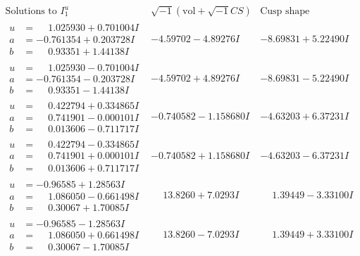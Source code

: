 \documentclass[1p]{elsarticle_modified}
\theoremstyle{definition}
\newcommand{\I}{\sqrt{-1}}
\begin{document}
$$\begin{array}{c|c|c}  
\text{Solutions to }I^u_{1}& \I (\text{vol} + \sqrt{-1}CS) & \text{Cusp shape}\\
 \hline 
\begin{aligned}
u &= \phantom{-}1.025930 + 0.701004 I \\
a &= -0.761354 + 0.203728 I \\
b &= \phantom{-}0.93351 + 1.44138 I\end{aligned}
 & -4.59702 - 4.89276 I & -8.69831 + 5.22490 I \\ \hline\begin{aligned}
u &= \phantom{-}1.025930 - 0.701004 I \\
a &= -0.761354 - 0.203728 I \\
b &= \phantom{-}0.93351 - 1.44138 I\end{aligned}
 & -4.59702 + 4.89276 I & -8.69831 - 5.22490 I \\ \hline\begin{aligned}
u &= \phantom{-}0.422794 + 0.334865 I \\
a &= \phantom{-}0.741901 - 0.000101 I \\
b &= \phantom{-}0.013606 - 0.711717 I\end{aligned}
 & -0.740582 - 1.158680 I & -4.63203 + 6.37231 I \\ \hline\begin{aligned}
u &= \phantom{-}0.422794 - 0.334865 I \\
a &= \phantom{-}0.741901 + 0.000101 I \\
b &= \phantom{-}0.013606 + 0.711717 I\end{aligned}
 & -0.740582 + 1.158680 I & -4.63203 - 6.37231 I \\ \hline\begin{aligned}
u &= -0.96585 + 1.28563 I \\
a &= \phantom{-}1.086050 - 0.661498 I \\
b &= \phantom{-}0.30067 + 1.70085 I\end{aligned}
 & \phantom{-}13.8260 + 7.0293 I & \phantom{-}1.39449 - 3.33100 I \\ \hline\begin{aligned}
u &= -0.96585 - 1.28563 I \\
a &= \phantom{-}1.086050 + 0.661498 I \\
b &= \phantom{-}0.30067 - 1.70085 I\end{aligned}
 & \phantom{-}13.8260 - 7.0293 I & \phantom{-}1.39449 + 3.33100 I \\ \hline\begin{aligned}

\end{aligned}
\end{array}$$
\end{document}
